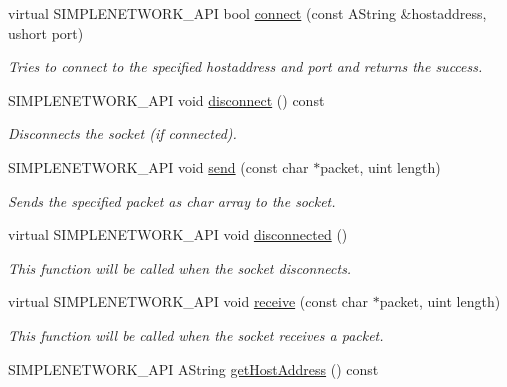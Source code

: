 \begin{DoxyCompactItemize}
virtual S\+I\+M\+P\+L\+E\+N\+E\+T\+W\+O\+R\+K\+\_\+\+A\+PI bool \mbox{\hyperlink{class_tcp_socket_a396dcc6c060e02611574c18474deedfc}{connect}} (const A\+String \&hostaddress, ushort port)
\begin{DoxyCompactList}\small\item\em Tries to connect to the specified hostaddress and port and returns the success. \end{DoxyCompactList}\item 
\mbox{\label{class_tcp_socket_a9f1317cd06b134fc78d01fe8554224a2}} 
S\+I\+M\+P\+L\+E\+N\+E\+T\+W\+O\+R\+K\+\_\+\+A\+PI void \mbox{\hyperlink{class_tcp_socket_a9f1317cd06b134fc78d01fe8554224a2}{disconnect}} () const
\begin{DoxyCompactList}\small\item\em Disconnects the socket (if connected). \end{DoxyCompactList}\item 
S\+I\+M\+P\+L\+E\+N\+E\+T\+W\+O\+R\+K\+\_\+\+A\+PI void \mbox{\hyperlink{class_tcp_socket_a9e62b6ef15b2e10d2aa8316439651cd3}{send}} (const char $\ast$packet, uint length)
\begin{DoxyCompactList}\small\item\em Sends the specified packet as char array to the socket. \end{DoxyCompactList}\item 
\mbox{\label{class_tcp_socket_ae0c08bf335add79276d2418f9cf36945}} 
virtual S\+I\+M\+P\+L\+E\+N\+E\+T\+W\+O\+R\+K\+\_\+\+A\+PI void \mbox{\hyperlink{class_tcp_socket_ae0c08bf335add79276d2418f9cf36945}{disconnected}} ()
\begin{DoxyCompactList}\small\item\em This function will be called when the socket disconnects. \end{DoxyCompactList}\item 
virtual S\+I\+M\+P\+L\+E\+N\+E\+T\+W\+O\+R\+K\+\_\+\+A\+PI void \mbox{\hyperlink{class_tcp_socket_a5c2013596b0f1a79502984cfe48ff192}{receive}} (const char $\ast$packet, uint length)
\begin{DoxyCompactList}\small\item\em This function will be called when the socket receives a packet. \end{DoxyCompactList}\item 
S\+I\+M\+P\+L\+E\+N\+E\+T\+W\+O\+R\+K\+\_\+\+A\+PI A\+String \mbox{\hyperlink{class_tcp_socket_a1638a4368afb26acee666ea497ba737e}{get\+Host\+Address}} () const

\end{DoxyCompactItemize}
